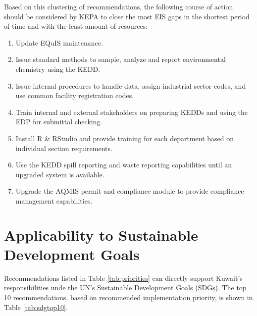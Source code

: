 Based on this clustering of recommendations, the following course of action should be considered by KEPA to close the most EIS gaps in the shortest period of time and with the least amount of resources:

\begin{enumerate}
\item Update EQuIS maintenance.
\item Issue standard methods to sample, analyze and report environmental chemistry using the KEDD.
\item Issue internal procedures to handle data, assign industrial sector codes, and use common facility registration codes.
\item Train internal and external stakeholders on preparing KEDDs and using the EDP for submittal checking.
\item Install R \& RStudio and provide training for each department based on individual section requirements.
\item Use the KEDD spill reporting and waste reporting capabilities until an upgraded system is available.
\item Upgrade the AQMIS permit and compliance module to provide compliance management capabilities.
\end{enumerate}

\section{Applicability to Sustainable Development Goals}

Recommendations listed in Table \ref{tab:priorities} can directly support Kuwait's responsibilities unde the UN's Sustainable Development Goals (SDGs).  The top 10 recommendations, based on recommended implementation priority, is shown in Table \ref{tab:sdgtop10}.

